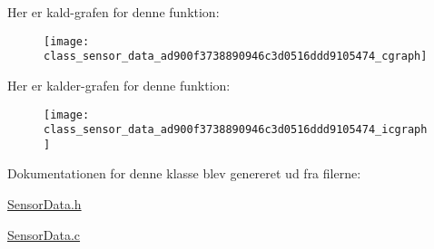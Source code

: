 Her er kald-\/grafen for denne funktion\+:\nopagebreak
\begin{figure}[H]
\begin{center}
\leavevmode
\texttt{[image: class\_sensor\_data\_ad900f3738890946c3d0516ddd9105474\_cgraph]}
\end{center}
\end{figure}




Her er kalder-\/grafen for denne funktion\+:\nopagebreak
\begin{figure}[H]
\begin{center}
\leavevmode
\texttt{[image: class\_sensor\_data\_ad900f3738890946c3d0516ddd9105474\_icgraph]}
\end{center}
\end{figure}




Dokumentationen for denne klasse blev genereret ud fra filerne\+:\begin{DoxyCompactItemize}
\item 
\hyperlink{_sensor_data_8h}{Sensor\+Data.\+h}\item 
\hyperlink{_sensor_data_8c}{Sensor\+Data.\+c}\end{DoxyCompactItemize}
